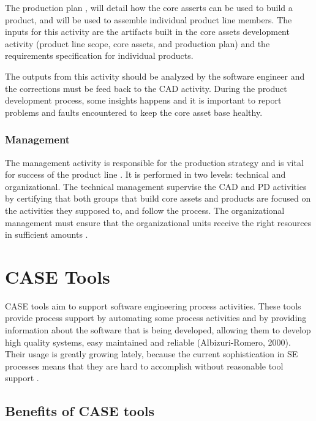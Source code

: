The production plan , will detail how the core asserts can be used to build a product, and will be used to assemble individual product line members. The inputs for this activity are the artifacts built in the core assets development activity (product line scope, core assets, and production plan) and the requirements specification for individual products.

The outputs from this activity should be analyzed by the software engineer and the corrections must be feed back to the \acf{CAD} activity. During the product development process, some insights happens and it is important to report problems and faults encountered to keep the core asset base healthy.



\subsubsection{Management}

The management activity is responsible for the production strategy and is vital for success of the product line \citep{Pohl2005}. It is performed in two levels: technical and organizational. The technical management supervise the CAD and PD activities by certifying that both groups that build core assets and products are focused on the activities they supposed to, and follow the process. The organizational management must ensure that the organizational units receive the right resources in sufficient amounts \citep{clements2002software}.

\section{CASE Tools}
\label{sc:casetools}
\acf{CASE} tools aim to support software engineering process activities. These tools provide process support by automating some process activities and by providing information about the software that is being developed, allowing them to develop high quality systems, easy maintained and reliable (Albizuri-Romero, 2000). Their usage is greatly growing lately, because the current sophistication in SE processes means that they are hard to accomplish without reasonable tool support \citep{Dhungana2007}.

\subsection{Benefits of CASE tools}

